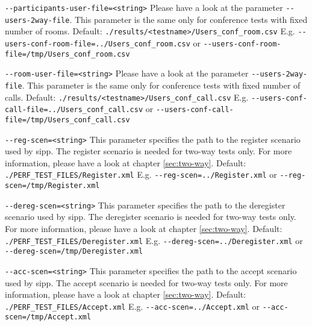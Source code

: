\begin {description}
\item {\texttt{-{}-participants-user-file=<string>}} \newline
Please have a look at the parameter \texttt{-{}-users-2way-file}.
This parameter is the same only for conference tests with fixed number of rooms.
\newline Default: \texttt{./results/<testname>/Users\_conf\_room.csv}
\newline E.g. \texttt{-{}-users-conf-room-file=../Users\_conf\_room.csv}
\newline or \texttt{-{}-users-conf-room-file=/tmp/Users\_conf\_room.csv}

\item {\texttt{-{}-room-user-file=<string>}} \newline
Please have a look at the parameter \texttt{-{}-users-2way-file}.
This parameter is the same only for conference tests with fixed number of calls.
\newline Default: \texttt{./results/<testname>/Users\_conf\_call.csv}
\newline E.g. \texttt{-{}-users-conf-call-file=../Users\_conf\_call.csv}
\newline or \texttt{-{}-users-conf-call-file=/tmp/Users\_conf\_call.csv}

\item {\texttt{-{}-reg-scen=<string>}} \newline
This parameter specifies the path to the register scenario used by sipp.
The register scenario is needed for two-way tests only.
For more information, please have a look at chapter \ref{sec:two-way}.
\newline Default: \texttt{./PERF\_TEST\_FILES/Register.xml}
\newline E.g. \texttt{-{}-reg-scen=../Register.xml} or \texttt{-{}-reg-scen=/tmp/Register.xml}

\item {\texttt{-{}-dereg-scen=<string>}} \newline
This parameter specifies the path to the deregister scenario used by sipp.
The deregister scenario is needed for two-way tests only.
For more information, please have a look at chapter \ref{sec:two-way}.
\newline Default: \texttt{./PERF\_TEST\_FILES/Deregister.xml}
\newline E.g. \texttt{-{}-dereg-scen=../Deregister.xml} or \texttt{-{}-dereg-scen=/tmp/Deregister.xml}

\item {\texttt{-{}-acc-scen=<string>}} \newline
This parameter specifies the path to the accept scenario used by sipp.
The accept scenario is needed for two-way tests only.
For more information, please have a look at chapter \ref{sec:two-way}.
\newline Default: \texttt{./PERF\_TEST\_FILES/Accept.xml}
\newline E.g. \texttt{-{}-acc-scen=../Accept.xml} or \texttt{-{}-acc-scen=/tmp/Accept.xml}


\end{description}
